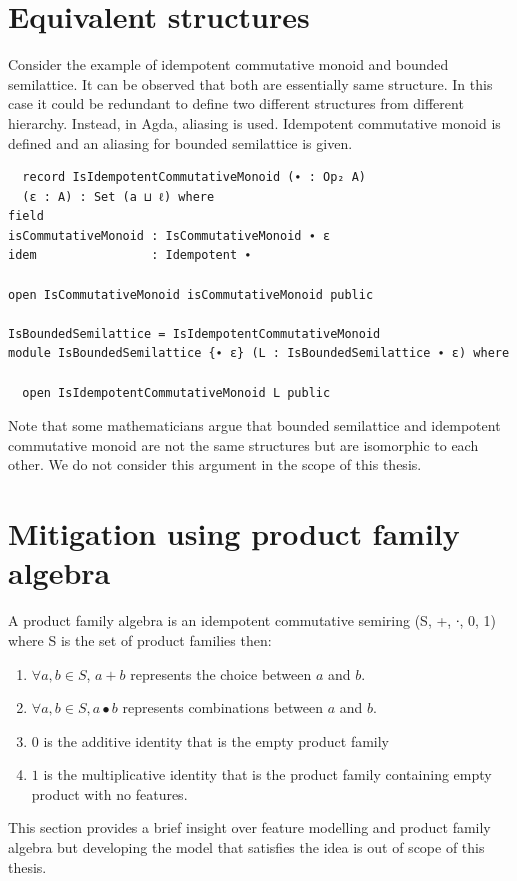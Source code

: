 \section{Equivalent structures}
Consider the example of idempotent commutative monoid and bounded semilattice.
It can be observed that both are essentially same structure. In this case it
could be redundant to define two different structures from different hierarchy.
Instead, in Agda, aliasing is used. Idempotent commutative monoid is defined and
an aliasing for bounded semilattice is given.
\begin{verbatim}
  record IsIdempotentCommutativeMonoid (∙ : Op₂ A)
  (ε : A) : Set (a ⊔ ℓ) where
field
isCommutativeMonoid : IsCommutativeMonoid ∙ ε
idem                : Idempotent ∙

open IsCommutativeMonoid isCommutativeMonoid public

IsBoundedSemilattice = IsIdempotentCommutativeMonoid
module IsBoundedSemilattice {∙ ε} (L : IsBoundedSemilattice ∙ ε) where

  open IsIdempotentCommutativeMonoid L public
\end{verbatim}

Note that some mathematicians argue that bounded semilattice and idempotent
commutative monoid are not the same structures but are isomorphic to each other.
We do not consider this argument in the scope of this thesis.

\section{Mitigation using product family algebra}
A product family algebra is an idempotent commutative semiring (S, +,  ∙, 0, 1)
where S is the set of product families then:
\begin{enumerate}
 \item \(\forall a, b \in S\), $a + b$ represents the choice between $a$ and $b$.
 \item \(\forall a, b \in S, a ∙ b\) represents combinations between $a$ and
 $b$.
 \item $0$ is the additive identity that is the empty product family \\
 \item $1$ is the multiplicative identity that is the product family containing
 empty product with no features.
\end{enumerate}
This section provides a brief insight over feature modelling and product family
algebra but developing the model that satisfies the idea is out of scope of this
thesis.


